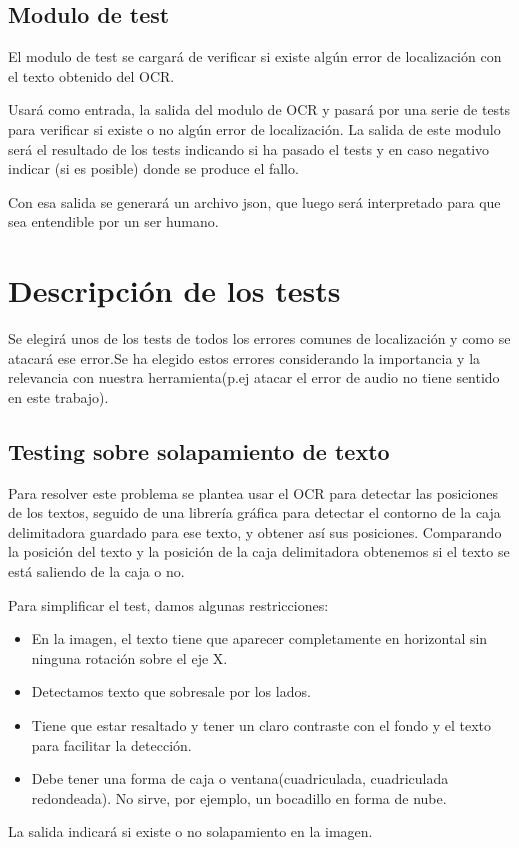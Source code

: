 \subsection{Modulo de test}
El modulo de test se cargará de verificar si existe algún error de localización con el texto obtenido del OCR.

Usará como entrada, la salida del modulo de OCR y pasará por una serie de tests para verificar si existe o no algún error de localización. La salida de este modulo será el resultado de los tests indicando si ha pasado el tests y en caso negativo indicar (si es posible) donde se produce el fallo.

Con esa salida se generará un archivo json, que luego será interpretado para que sea entendible por un ser humano.
\section{Descripción de los tests}
\label{sec:Descripción de los tests}

Se elegirá unos de los tests de todos los errores comunes de localización y como se atacará ese error.Se ha elegido estos errores considerando la importancia y la relevancia con nuestra herramienta(p.ej atacar el error de audio no tiene sentido en este trabajo).

\subsection{Testing sobre solapamiento de texto }
Para resolver este problema se plantea usar el OCR para detectar las posiciones de los textos, seguido de una librería gráfica para detectar el contorno de la caja delimitadora guardado para ese texto, y obtener así sus posiciones. Comparando la posición del texto y la posición de la caja delimitadora obtenemos si el texto se está saliendo de la caja o no.

Para simplificar el test, damos algunas restricciones: 
\begin{itemize}
	\item En la imagen, el texto tiene que aparecer completamente en horizontal sin ninguna rotación sobre el eje X.
	\item Detectamos texto que sobresale por los lados.
	\item Tiene que estar resaltado y tener un claro contraste con el fondo y el texto para facilitar la detección.
	\item Debe tener una forma de caja o ventana(cuadriculada, cuadriculada redondeada). No sirve, por ejemplo, un bocadillo en forma de nube.
\end{itemize} 
La salida indicará si existe o no solapamiento en la imagen.

